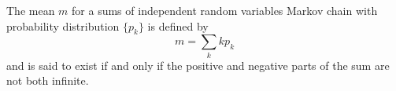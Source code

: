 The mean $m$ for a sums of independent random variables Markov chain with probability distribution $\{p_k\}$ is defined by
$$m = \sum_k k p_k$$
and is said to exist if and only if the positive and negative parts of the sum are not both infinite.

